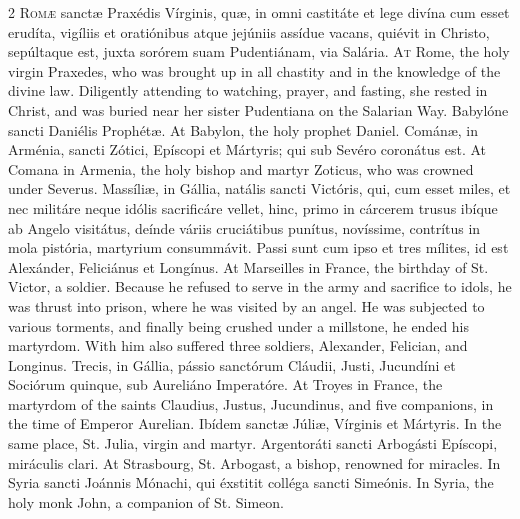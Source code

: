 \begin{paracol}{2}
\lettrine[lines=2]{R}{omæ} sanctæ Praxédis 
 Vírginis, quæ, in omni castitáte et lege divína cum esset erudíta, vigíliis 
 et oratiónibus atque jejúniis assídue vacans, quiévit in Christo, sepúltaque est, juxta sorórem suam Pudentiánam, via Salária.
\switchcolumn
{}
\lettrine[lines=2]{A}{t} Rome, the holy virgin Praxedes, 
 who was brought up in all chastity and in the knowledge of the divine law. 
 Diligently attending to watching, prayer, and fasting, she rested in Christ, 
 and was buried near her sister Pudentiana on the Salarian Way.
\switchcolumn*
{}
Babylóne sancti 
 Daniélis Prophétæ.
\switchcolumn
{}
At Babylon, the holy prophet Daniel.
\switchcolumn*
{}
Cománæ, in Arménia, sancti Zótici, Epíscopi et Mártyris; qui sub Sevéro coronátus est.
\switchcolumn
{}
At Comana in Armenia, the holy 
 bishop and martyr Zoticus, who was crowned under Severus.
\switchcolumn*
{}
Massíliæ, in Gállia, 
 natális sancti Victóris, qui, cum esset miles, et nec militáre neque idólis 
 sacrificáre vellet, hinc, primo in cárcerem trusus ibíque ab Angelo 
 visitátus, deínde váriis cruciátibus punítus, novíssime, contrítus in mola 
 pistória, martyrium consummávit. Passi sunt cum ipso et tres mílites, 
 id est Alexánder, Feliciánus et Longínus.
\switchcolumn
{}
At Marseilles in France, the 
 birthday of St. Victor, a soldier. Because he refused to serve in the 
 army and sacrifice to idols, he was thrust into prison, where he was visited 
 by an angel. He was subjected to various torments, and finally being 
 crushed under a millstone, he ended his martyrdom. With him also 
 suffered three soldiers, Alexander, Felician, and Longinus.
\switchcolumn*
{}
Trecis, in Gállia, 
 pássio sanctórum Cláudii, Justi, Jucundíni et Sociórum quinque, sub 
 Aureliáno Imperatóre.
\switchcolumn
{}
At Troyes in France, the martyrdom 
 of the saints Claudius, Justus, Jucundinus, and five companions, in the time 
 of Emperor Aurelian.
\switchcolumn*
{}
Ibídem sanctæ Júliæ, 
 Vírginis et Mártyris.
\switchcolumn
{}
In the same place, St. Julia, virgin 
 and martyr.
\switchcolumn*
{}
Argentoráti sancti 
 Arbogásti Epíscopi, miráculis clari.
\switchcolumn
{}
At Strasbourg, St. Arbogast, a 
 bishop, renowned for miracles.
\switchcolumn*
{}
In Syria sancti Joánnis 
 Mónachi, qui éxstitit colléga sancti Simeónis.
\switchcolumn
{}
In Syria, the holy monk John, a 
 companion of St. Simeon.
\switchcolumn*
{}
\end{paracol}


